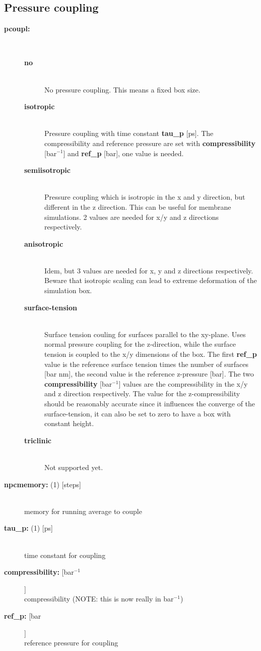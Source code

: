 \subsection{ Pressure coupling}
\begin{description}
\item[{\bf pcoupl:}]\mbox{}\\
\vspace{-2ex}\begin{description}
\item[{\bf no}]\mbox{}\\
No pressure coupling. This means a fixed box size.
\item[{\bf isotropic}]\mbox{}\\
Pressure coupling with time constant {\bf tau\_p} [ps].
The compressibility and reference pressure are set with
{\bf compressibility} [bar$^{-1}$] and {\bf ref\_p} [bar], one
value is needed.
\item[{\bf semiisotropic}]\mbox{}\\
Pressure coupling which is isotropic in the x and y direction,
but different in the z direction.
This can be useful for membrane simulations.
2 values are needed for x/y and z directions respectively.
\item[{\bf anisotropic}]\mbox{}\\
Idem, but 3 values are needed for x, y and z directions respectively.
Beware that isotropic scaling can lead to extreme deformation
of the simulation box.
\item[{\bf surface-tension}]\mbox{}\\
Surface tension couling for surfaces parallel to the xy-plane.
Uses normal pressure coupling for the z-direction, while the surface tension
is coupled to the x/y dimensions of the box.
The first {\bf ref\_p} value is the reference surface tension times
the number of surfaces [bar nm], 
the second value is the reference z-pressure [bar].
The two {\bf compressibility} [bar$^{-1}$] values are the compressibility
in the x/y and z direction respectively.
The value for the z-compressibility should be reasonably accurate since it
influences the converge of the surface-tension, it can also be set to zero
to have a box with constant height.
\item[{\bf triclinic}]\mbox{}\\
Not supported yet.
\end{description}
\item[{\bf npcmemory: }(1) {[steps]}]\mbox{}\\
memory for running average to couple
\item[{\bf tau\_p: }(1) {[ps]}]\mbox{}\\
time constant for coupling
\item[{\bf compressibility: }[bar$^{-1}$]]\mbox{}\\
compressibility (NOTE: this is now really in bar$^{-1}$)
\item[{\bf ref\_p: }[bar]]\mbox{}\\
reference pressure for coupling
\end{description}

